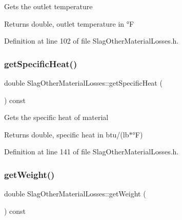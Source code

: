 Gets the outlet temperature

\begin{DoxyReturn}{Returns}
double, outlet temperature in °F 
\end{DoxyReturn}


Definition at line 102 of file Slag\+Other\+Material\+Losses.\+h.

\mbox{\label{class_slag_other_material_losses_aa68e92bdf836a4112c55344f897f2649}} 
\subsubsection{\texorpdfstring{get\+Specific\+Heat()}{getSpecificHeat()}}
{\footnotesize\ttfamily double Slag\+Other\+Material\+Losses\+::get\+Specific\+Heat (\begin{DoxyParamCaption}{ }\end{DoxyParamCaption}) const\hspace{0.3cm}{\ttfamily [inline]}}

Gets the specific heat of material

\begin{DoxyReturn}{Returns}
double, specific heat in btu/(lb$\ast$°F) 
\end{DoxyReturn}


Definition at line 141 of file Slag\+Other\+Material\+Losses.\+h.

\mbox{\label{class_slag_other_material_losses_a9b62b86eb4ec919d70dd8899ef5d3513}} 
\subsubsection{\texorpdfstring{get\+Weight()}{getWeight()}}
{\footnotesize\ttfamily double Slag\+Other\+Material\+Losses\+::get\+Weight (\begin{DoxyParamCaption}{ }\end{DoxyParamCaption}) const\hspace{0.3cm}{\ttfamily [inline]}}

